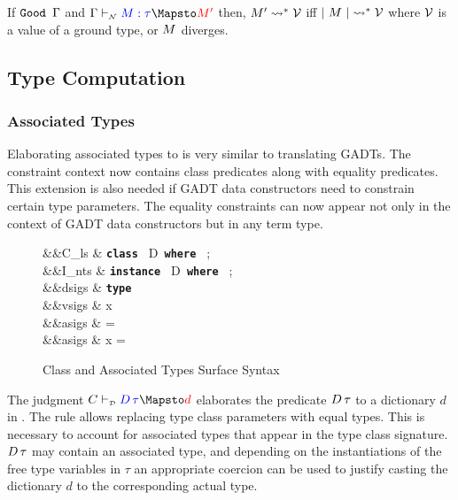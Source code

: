 \documentclass[screen,nonacm,manuscript,review]{acmart} %
\begin{document}
\begin{theorem}\label{lem:nt-syntax-soundness}
 If $\texttt{Good~}\Gamma$ and $\NTTranslate {\TEnv} \Tm \tau {\Tm'}$ then, $M' \rightsquigarrow^* \mathcal{V}$ iff $|~{M}~| \rightsquigarrow^* \mathcal{V}$ where $\mathcal{V}$ is a value of
 a ground type, or $M$ diverges.
\end{theorem}

\subsection{Type Computation}
\subsubsection{Associated Types}\label{sec:fc-encodes-assoctypes}
Elaborating associated types to \SFC is very similar to translating
GADTs. The constraint context now contains class predicates along with
equality predicates. This extension is also needed if GADT data
constructors need to constrain certain type parameters. The equality
constraints can now appear not only in the context of GADT data
constructors but in any term type.

\begin{figure}[ht]
 \centering
 \begin{syntax}
  &&C_{ls} \bnfeq& \textbf{\texttt{class }} D\App\many\TyVar \textbf{\texttt{ where }} ; \\
  &&I_{nts} \bnfeq& \textbf{\texttt{instance }} D\App\many\tau \textbf{\texttt{ where }} ; \\
  &&dsigs \bnfeq& \textbf{\texttt{type }} \tau\\
  &&vsigs \bnfeq& x\co\tau\\
  &&asigs \bnfeq& \tau = \sigma\\
  &&asigs \bnfeq& x = \Tm
 \end{syntax}
 \caption[Class Syntax]{Class and Associated Types Surface Syntax}
 \label{fig:assoc-types-syntax}
\end{figure}

The judgment $\DTranslate C {D\App\tau} d$ elaborates the predicate
$D\,\tau$ to a dictionary $d$ in \SFC. The rule  allows
replacing type class parameters with equal types. This is necessary to
account for associated types that appear in the type class
signature. $D\,\tau$ may contain an associated type, and depending
on the instantiations of the free type variables in $\tau$ an
appropriate coercion can be used to justify casting the dictionary $d$
to the corresponding actual type.
\end{document}
